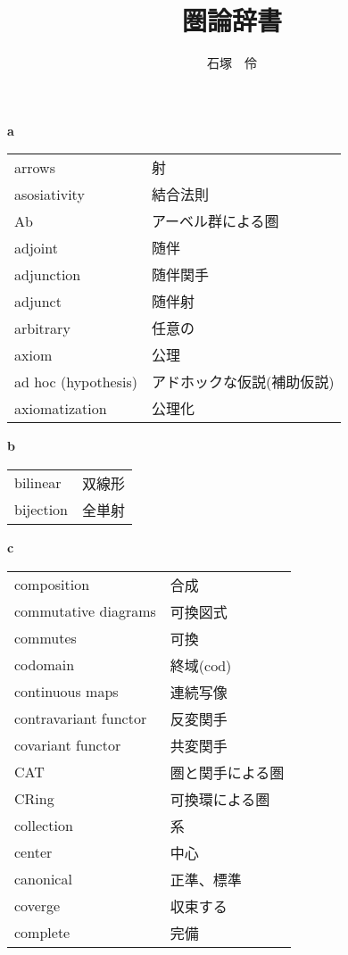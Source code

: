 \documentclass[dvipdfmx]{jsarticle}
\title{圏論辞書}
\author{石塚　伶}
\date{}
\begin{document}
\maketitle

\textbf{a}

  \begin{tabular}{ll}
    arrows & 射 \\
    asosiativity & 結合法則 \\
    Ab & アーベル群による圏 \\
    adjoint & 随伴 \\
    adjunction & 随伴関手 \\
    adjunct & 随伴射 \\
    arbitrary & 任意の \\
    axiom & 公理 \\
    ad hoc (hypothesis) & アドホックな仮説(補助仮説) \\
    axiomatization & 公理化 \\
  \end{tabular}

\textbf{b}

  \begin{tabular}{ll}
    bilinear & 双線形 \\
    bijection & 全単射 \\
  \end{tabular}

\textbf{c}

  \begin{tabular}{ll}
    composition & 合成 \\
    commutative diagrams & 可換図式 \\
    commutes & 可換 \\
    codomain & 終域($\mathrm{cod}$) \\
    continuous maps & 連続写像 \\
    contravariant functor & 反変関手 \\
    covariant functor & 共変関手 \\
    CAT & 圏と関手による圏 \\
    CRing & 可換環による圏 \\
    collection & 系 \\
    center & 中心 \\
    canonical & 正準、標準 \\
    coverge & 収束する \\
    complete & 完備 \\
  \end{tabular}
\end{document}
